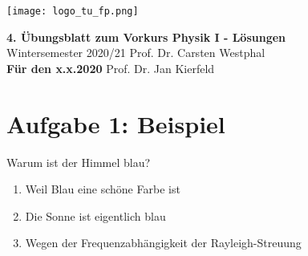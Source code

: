 \documentclass[11pt,a4paper, parskip=half ]{report}
\newcommand{\GrosserAbstand}{\\[12pt]}
\begin{document}
\texttt{[image: logo\_tu\_fp.png]}
\begin{center}
\Large{\textbf{4. \"Ubungsblatt zum Vorkurs Physik I - Lösungen}}
\GrosserAbstand
\normalsize
Wintersemester 2020/21 \hfill Prof. Dr. Carsten Westphal\\
\textbf{Für den x.x.2020} \hfill Prof. Dr. Jan Kierfeld \\
\end{center}

%
%
%
%

\section*{Aufgabe 1: Beispiel}
  Warum ist der Himmel blau?
  \begin{enumerate}
    \item Weil Blau eine schöne Farbe ist
    \item Die Sonne ist eigentlich blau
    \item Wegen der Frequenzabhängigkeit der Rayleigh-Streuung
  \end{enumerate}
\end{document}
